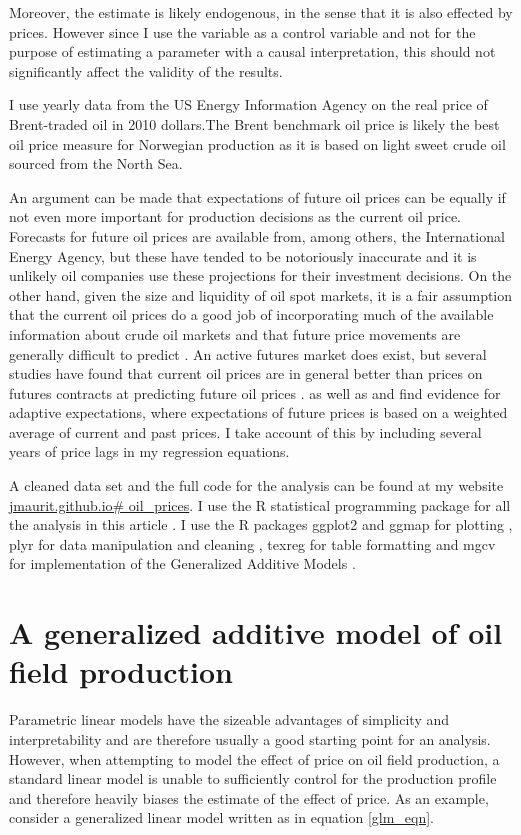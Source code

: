 \documentclass[12pt]{article}
\begin{document}
Moreover, the estimate is likely endogenous, in the sense that it is also effected by prices.  However since I use the variable as a control variable and not for the purpose of estimating a parameter with a causal interpretation, this should not significantly affect the validity of the results.  

I use yearly data from the US Energy Information Agency on the real price of Brent-traded oil in 2010 dollars.The Brent benchmark oil price is likely the best oil price measure for Norwegian production as it is based on light sweet crude oil sourced from the North Sea.  

An argument can be made that expectations of future oil prices can be equally if not even more important for production decisions as the current oil price.  Forecasts for future oil prices are available from, among others, the International Energy Agency, but these have tended to be notoriously inaccurate and it is unlikely oil companies use these projections for their investment decisions.  On the other hand, given the size and liquidity of oil spot markets, it is a fair assumption that the current oil prices do a good job of incorporating much of the available information about crude oil markets and that future price movements are generally difficult to predict \citep{hamilton_understanding_2008}.  An active futures market does exist, but several studies have found that current oil prices are in general better than prices on futures contracts at predicting future oil prices \citep{alquist_what_2010, chinn_predictive_2005}.  \citet{mohn_investment_2008} as well as \citet{pesaran_econometric_1990} and \citet{farzin_impact_2001} find evidence for adaptive expectations, where expectations of future prices is based on a weighted average of current and past prices.  I take account of this by including several years of price lags in my regression equations.  

A cleaned data set and the full code for the analysis can be found at my website \url{jmaurit.github.io# oil_prices}. I use the R statistical programming package for all the analysis in this article \citep{r_core_team_r:_2013}.  I use the R packages ggplot2 and ggmap for plotting \citep{wickham_ggplot2:_2009, kahle_ggmap:_2013}, plyr for data manipulation and cleaning \citep{wickham_split-apply-combine_2011}, texreg for table formatting \citep{leifeld_texreg:_2013} and mgcv for implementation of the Generalized Additive Models \citep{wood_fast_2011}.

\section{A generalized additive model of oil field production}
Parametric linear models have the sizeable advantages of simplicity and interpretability and are therefore usually a good starting point for an analysis.  However, when attempting to model the effect of price on oil field production, a standard linear model is unable to sufficiently control for the production profile and therefore heavily biases the estimate of the effect of price.  As an example, consider a generalized linear model written as in equation \ref{glm_eqn}. 
\end{document}
